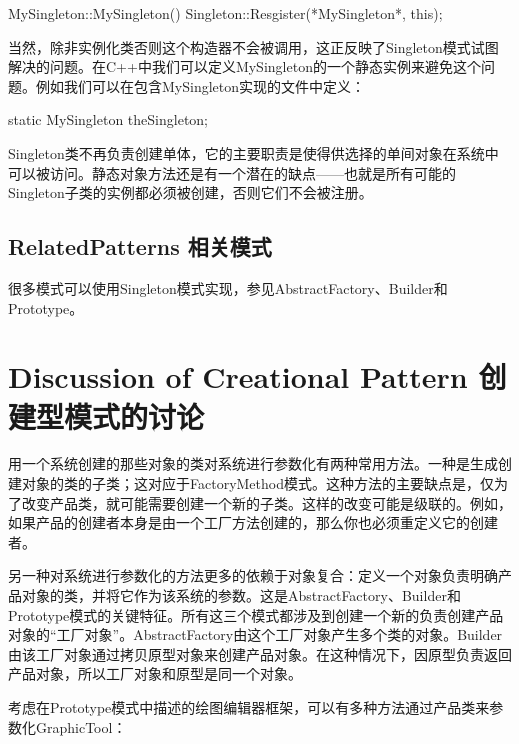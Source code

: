 \begin{itemize}
\begin{schemedisplay}

MySingleton::MySingleton(){
	Singleton::Resgister(*MySingleton*, this);
}

\end{schemedisplay}

	当然，除非实例化类否则这个构造器不会被调用，这正反映了Singleton模式试图解决的问题。在C++中我们可以定义MySingleton的一个静态实例来避免这个问题。例如我们可以在包含MySingleton实现的文件中定义：

\begin{schemedisplay}

static MySingleton theSingleton;

\end{schemedisplay}

    Singleton类不再负责创建单体，它的主要职责是使得供选择的单间对象在系统中可以被访问。静态对象方法还是有一个潜在的缺点——也就是所有可能的Singleton子类的实例都必须被创建，否则它们不会被注册。


\subsection{RelatedPatterns 相关模式}

很多模式可以使用Singleton模式实现，参见AbstractFactory、Builder和Prototype。

\section{Discussion of Creational Pattern 创建型模式的讨论}

用一个系统创建的那些对象的类对系统进行参数化有两种常用方法。一种是生成创建对象的类的子类；这对应于FactoryMethod模式。这种方法的主要缺点是，仅为了改变产品类，就可能需要创建一个新的子类。这样的改变可能是级联的。例如，如果产品的创建者本身是由一个工厂方法创建的，那么你也必须重定义它的创建者。

另一种对系统进行参数化的方法更多的依赖于对象复合：定义一个对象负责明确产品对象的类，并将它作为该系统的参数。这是AbstractFactory、Builder和Prototype模式的关键特征。所有这三个模式都涉及到创建一个新的负责创建产品对象的“工厂对象”。AbstractFactory由这个工厂对象产生多个类的对象。Builder由该工厂对象通过拷贝原型对象来创建产品对象。在这种情况下，因原型负责返回产品对象，所以工厂对象和原型是同一个对象。

考虑在Prototype模式中描述的绘图编辑器框架，可以有多种方法通过产品类来参数化GraphicTool：

\begin{itemize}


\end{itemize}
\end{itemize}
